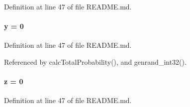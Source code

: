 Definition at line 47 of file README.md.\hypertarget{README_8md_a003dc5701d53a819228f5417a8089139}{
\paragraph[{y}]{ {\bf y} = 0}\hfill}
\label{README_8md_a003dc5701d53a819228f5417a8089139}


Definition at line 47 of file README.md.

Referenced by calcTotalProbability(), and genrand\_\-int32().\hypertarget{README_8md_a0f9f545825a114923b98de8cc33a5f6a}{
\paragraph[{z}]{ {\bf z} = 0}\hfill}
\label{README_8md_a0f9f545825a114923b98de8cc33a5f6a}


Definition at line 47 of file README.md.